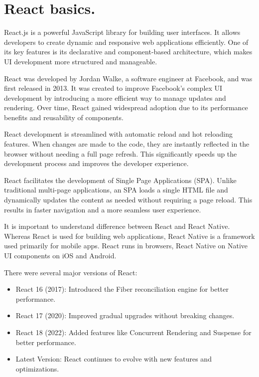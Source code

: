 
\pagebreak

\chapter{React basics.}


\medskip

React.js is a powerful JavaScript library for building user interfaces. It allows developers to create dynamic and responsive web applications efficiently. One of its key features is its declarative and component-based architecture, which makes UI development more structured and manageable.

React was developed by Jordan Walke, a software engineer at Facebook, and was first released in 2013. It was created to improve Facebook's complex UI development by introducing a more efficient way to manage updates and rendering. Over time, React gained widespread adoption due to its performance benefits and reusability of components.

React development is streamlined with automatic reload and hot reloading features. When changes are made to the code, they are instantly reflected in the browser without needing a full page refresh. This significantly speeds up the development process and improves the developer experience.

React facilitates the development of Single Page Applications (SPA). Unlike traditional multi-page applications, an SPA loads a single HTML file and dynamically updates the content as needed without requiring a page reload. This results in faster navigation and a more seamless user experience.

It is important to understand difference between React and React Native. Whereas React is used for building web applications, React Native is a framework used primarily for mobile apps. React runs in browsers, React Native on Native UI components on iOS and Android.

There were several major versions of React:

\begin{itemize}
\item React 16 (2017): Introduced the Fiber reconciliation engine for better performance.

\item React 17 (2020): Improved gradual upgrades without breaking changes.

\item React 18 (2022): Added features like Concurrent Rendering and Suspense for better performance.

\item Latest Version: React continues to evolve with new features and optimizations.
\end{itemize}

